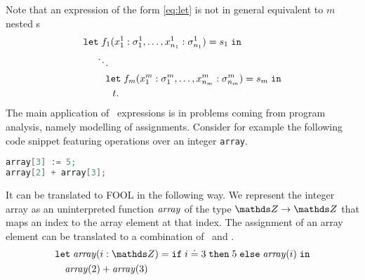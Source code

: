 Note that an expression of the form \eqref{eq:let} is not in general equivalent to $m$ nested \LETIN s
\begin{equation}\label{eq:let-singles}
\begin{aligned}
&\mathtt{let}\;{f_1(x^1_1:\sigma^1_1,\ldots,x^1_{n_1}:\sigma^1_{n_1})}={s_1}\;\mathtt{in}\\
&\quad\;\ddots\\
&\quad\quad\;\mathtt{let}\;{f_m(x^m_1:\sigma^m_1,\ldots,x^m_{n_m}:\sigma^m_{n_m})}={s_m}\;\mathtt{in}\\
&\quad\quad\quad t.
\end{aligned}
\end{equation}
The main application of \LETIN\ expressions is in problems coming from program analysis, namely modelling of assignments. Consider for example the following code snippet featuring operations over an integer \lstinline'array'.
\begin{lstlisting}[language=cpp]
array[3] := 5;
array[2] + array[3];
\end{lstlisting}
It can be translated to FOOL in the following way. We represent the integer array as an uninterpreted function $\mathit{array}$ of the type $\Z \to \Z$ that maps an index to the array element at that index. The assignment of an array element can be translated to a combination of \LETIN\ and \ITE.
\begin{equation}\label{eq:let-function-example}
\begin{aligned}
  &\mathtt{let}\;\binding{\arrayt(i:\Z)}{\ite{i \eql 3}{5}{\arrayt(i)}}\;\mathtt{in}\\
  &\quad\arrayt(2) + \arrayt(3)
\end{aligned}
\end{equation}


